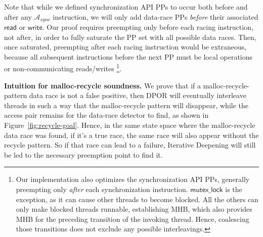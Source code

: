 Note that while we defined synchronization API PPs to occur both before and after any $\mathcal{A}_{sync}$ instruction,
we will only add data-race PPs {\em before} their associated $\mathsf{read}$ or $\mathsf{write}$.
Our proof requires preempting only before each racing instruction, not after,
in order to fully saturate the PP set with all possible data races.
Then, once saturated, preempting after each racing instruction would be extraneous,
because all subsequent instructions before the next PP must be local operations or non-communicating reads/writes%
%
\footnote{Our implementation also optimizes the synchronization API PPs,
generally preempting only {\em after} each synchronization instruction.
$\mathsf{mutex\_lock}$ is the exception, as it can cause other threads to become blocked.
All the others can only make blocked threads runnable, establishing MHB,
which also provides MHB for the preceding transition of the invoking thread.
Hence, coalescing those transitions does not exclude any possible interleavings.
}.

{\bf Intuition for malloc-recycle soundness.}
We prove that if a malloc-recycle-pattern data race is not a false positive, %
then DPOR %
will eventually interleave threads in such a way that the malloc-recycle pattern will disappear,
while the access pair remains for the data-race detector to find, as shown in Figure~\ref{fig:recycle-goal}.
Hence, in the same state space where the malloc-recycle data race was found, if it's a true race, the same race will also appear without the recycle pattern.
So if that race can lead to a failure, Iterative Deepening will still be led to the necessary preemption point to find it.
